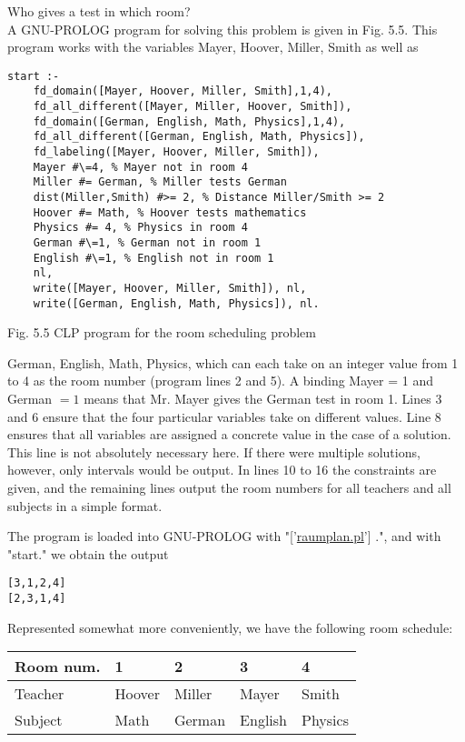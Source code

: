 \documentclass[10pt]{article}
\begin{document}
Who gives a test in which room?\\
A GNU-PROLOG program for solving this problem is given in Fig. 5.5. This program works with the variables Mayer, Hoover, Miller, Smith as well as

\begin{verbatim}
start :-
    fd_domain([Mayer, Hoover, Miller, Smith],1,4),
    fd_all_different([Mayer, Miller, Hoover, Smith]),
    fd_domain([German, English, Math, Physics],1,4),
    fd_all_different([German, English, Math, Physics]),
    fd_labeling([Mayer, Hoover, Miller, Smith]),
    Mayer #\=4, % Mayer not in room 4
    Miller #= German, % Miller tests German
    dist(Miller,Smith) #>= 2, % Distance Miller/Smith >= 2
    Hoover #= Math, % Hoover tests mathematics
    Physics #= 4, % Physics in room 4
    German #\=1, % German not in room 1
    English #\=1, % English not in room 1
    nl,
    write([Mayer, Hoover, Miller, Smith]), nl,
    write([German, English, Math, Physics]), nl.
\end{verbatim}

Fig. 5.5 CLP program for the room scheduling problem

German, English, Math, Physics, which can each take on an integer value from 1 to 4 as the room number (program lines 2 and 5). A binding Mayer = 1 and German $=1$ means that Mr. Mayer gives the German test in room 1. Lines 3 and 6 ensure that the four particular variables take on different values. Line 8 ensures that all variables are assigned a concrete value in the case of a solution. This line is not absolutely necessary here. If there were multiple solutions, however, only intervals would be output. In lines 10 to 16 the constraints are given, and the remaining lines output the room numbers for all teachers and all subjects in a simple format.

The program is loaded into GNU-PROLOG with "['\href{http://raumplan.pl}{raumplan.pl}'] .", and with "start." we obtain the output

\begin{verbatim}
[3,1,2,4]
[2,3,1,4]
\end{verbatim}

Represented somewhat more conveniently, we have the following room schedule:

\begin{center}
\begin{tabular}{lllll}
\hline
Room num. & 1 & 2 & 3 & 4 \\
\hline
Teacher & Hoover & Miller & Mayer & Smith \\
\hline
Subject & Math & German & English & Physics \\
\hline
\end{tabular}
\end{center}
\end{document}

